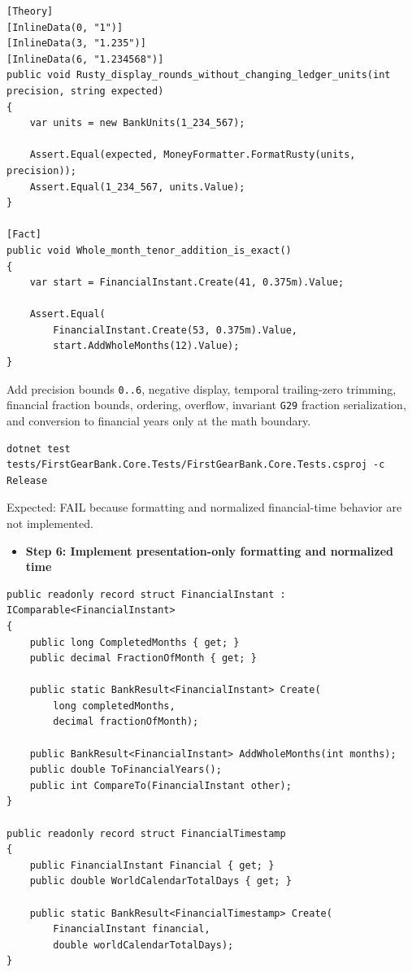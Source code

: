 \documentclass[
  10pt,
  letterpaper,
]{article}
\newcommand{\passthrough}[1]{#1}
\providecommand{\tightlist}{%
  \setlength{\itemsep}{0pt}\setlength{\parskip}{0pt}}
\begin{document}
\begin{lstlisting}
[Theory]
[InlineData(0, "1")]
[InlineData(3, "1.235")]
[InlineData(6, "1.234568")]
public void Rusty_display_rounds_without_changing_ledger_units(int precision, string expected)
{
    var units = new BankUnits(1_234_567);

    Assert.Equal(expected, MoneyFormatter.FormatRusty(units, precision));
    Assert.Equal(1_234_567, units.Value);
}

[Fact]
public void Whole_month_tenor_addition_is_exact()
{
    var start = FinancialInstant.Create(41, 0.375m).Value;

    Assert.Equal(
        FinancialInstant.Create(53, 0.375m).Value,
        start.AddWholeMonths(12).Value);
}
\end{lstlisting}

Add precision bounds \passthrough{\lstinline!0..6!}, negative display,
temporal trailing-zero trimming, financial fraction bounds, ordering,
overflow, invariant \passthrough{\lstinline!G29!} fraction
serialization, and conversion to financial years only at the math
boundary.

\begin{lstlisting}
dotnet test tests/FirstGearBank.Core.Tests/FirstGearBank.Core.Tests.csproj -c Release
\end{lstlisting}

Expected: FAIL because formatting and normalized financial-time behavior
are not implemented.

\begin{itemize}
\tightlist
\item[$\square$]
  \textbf{Step 6: Implement presentation-only formatting and normalized
  time}
\end{itemize}

\begin{lstlisting}
public readonly record struct FinancialInstant : IComparable<FinancialInstant>
{
    public long CompletedMonths { get; }
    public decimal FractionOfMonth { get; }

    public static BankResult<FinancialInstant> Create(
        long completedMonths,
        decimal fractionOfMonth);

    public BankResult<FinancialInstant> AddWholeMonths(int months);
    public double ToFinancialYears();
    public int CompareTo(FinancialInstant other);
}

public readonly record struct FinancialTimestamp
{
    public FinancialInstant Financial { get; }
    public double WorldCalendarTotalDays { get; }

    public static BankResult<FinancialTimestamp> Create(
        FinancialInstant financial,
        double worldCalendarTotalDays);
}
\end{lstlisting}
\end{document}

